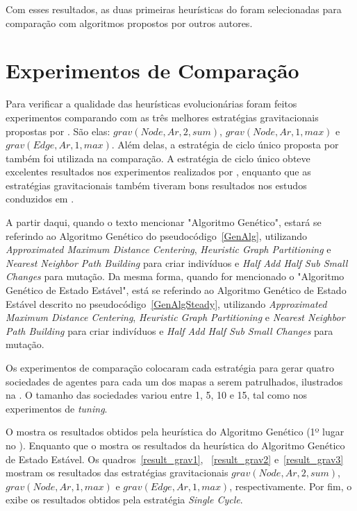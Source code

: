 Com esses resultados, as duas primeiras heurísticas do  foram 
selecionadas para comparação com algoritmos propostos por outros autores.

\section{Experimentos de Comparação}

Para verificar a qualidade das heurísticas evolucionárias foram feitos 
experimentos comparando com as três melhores estratégias gravitacionais 
propostas por \citep{sampaiophd}. São elas: $grav(Node,Ar,2,sum)$, 
$grav(Node,Ar,1,max)$ e $grav(Edge,Ar,1,max)$. Além delas, a estratégia de ciclo 
único proposta por \citep{Chevaleyre:2004:TAM:1018411.1019013} também foi 
utilizada na comparação. A estratégia de ciclo único obteve excelentes 
resultados nos experimentos realizados por \citep{Almeida:2004:AAI}, enquanto 
que as estratégias gravitacionais também tiveram bons resultados nos estudos 
conduzidos em \citep{sampaiophd}.

A partir daqui, quando o texto mencionar "Algoritmo Genético", estará se 
referindo ao Algoritmo Genético do pseudocódigo~\ref{GenAlg}, utilizando 
\textit{Approximated Maximum Distance Centering}, 
\textit{Heuristic Graph Partitioning} e \textit{Nearest Neighbor Path Building} 
para criar indivíduos e \textit{Half Add Half Sub Small Changes} para mutação.
Da mesma forma, quando for mencionado o "Algoritmo Genético de Estado Estável", 
está se referindo ao Algoritmo Genético de Estado Estável descrito no 
pseudocódigo~\ref{GenAlgSteady}, utilizando 
\textit{Approximated Maximum Distance Centering}, 
\textit{Heuristic Graph Partitioning} e \textit{Nearest Neighbor Path Building} 
para criar indivíduos e \textit{Half Add Half Sub Small Changes} para mutação.


Os experimentos de comparação colocaram cada estratégia para gerar quatro 
sociedades de agentes para cada um dos mapas a serem patrulhados, ilustrados na 
. O tamanho das sociedades variou entre 1, 5, 10 e 15, tal 
como nos experimentos de \textit{tuning}.

O  mostra os resultados obtidos pela heurística do 
Algoritmo Genético (1º lugar no ). Enquanto que o 
 mostra os resultados da heurística do Algoritmo 
Genético de Estado Estável. Os quadros~\ref{result_grav1}, ~\ref{result_grav2} 
e~\ref{result_grav3} mostram os resultados das estratégias gravitacionais 
$grav(Node,Ar,2,sum)$, $grav(Node,Ar,1,max)$ e $grav(Edge,Ar,1,max)$, 
respectivamente. Por fim, o  exibe os resultados obtidos 
pela estratégia \textit{Single Cycle}.

